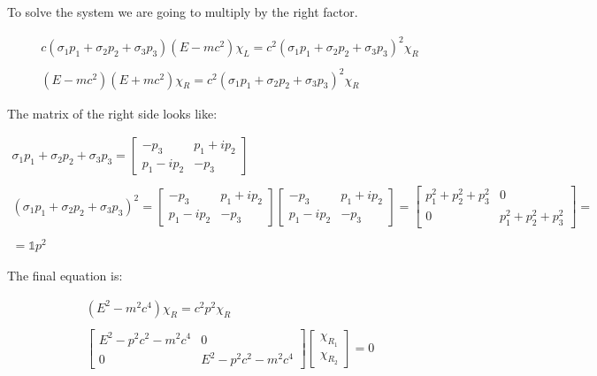 To solve the system we are going to multiply by the right factor.

\begin{equation}
  \begin{array}{c}
    c(\sigma_1 p_1 + \sigma_2 p_2 + \sigma_3 p_3)(E-mc^2) \chi_L = c^2 (\sigma_1 p_1 + \sigma_2 p_2 + \sigma_3 p_3)^2\chi_R
    \\

    \\
    (E-mc^2)(E+mc^2) \chi_R = c^2 (\sigma_1 p_1 + \sigma_2 p_2 + \sigma_3 p_3)^2\chi_R
  \end{array}
\end{equation}

The matrix of the right side looks like:

\begin{equation}
  \begin{array}{c}
    \sigma_1 p_1 + \sigma_2 p_2 + \sigma_3 p_3 = \begin{bmatrix}
      -p_3 & p_1 + ip_2\\
      p_1 - ip_2 & -p_3
      \end{bmatrix}
    \\

    \\
    (\sigma_1 p_1 + \sigma_2 p_2 + \sigma_3 p_3)^2 = \begin{bmatrix}
    -p_3 & p_1 + ip_2\\
    p_1 - ip_2 & -p_3
    \end{bmatrix}\begin{bmatrix}
    -p_3 & p_1 + ip_2\\
    p_1 - ip_2 & -p_3
    \end{bmatrix} = \begin{bmatrix}
    p_1^2 + p_2^2 + p_3^2 & 0\\
    0 & p_1^2 + p_2^2 + p_3^2
    \end{bmatrix} =
    \\

    \\
    = \mathbb{1} p^2
  \end{array}
\end{equation}

The final equation is:

\begin{equation}
  \begin{array}{c}
    (E^2-m^2c^4)\chi_R = c^2 p^2\chi_R
    \\

    \\
    \begin{bmatrix}
      E^2-p^2c^2-m^2c^4 & 0\\
      0 & E^2-p^2c^2-m^2c^4
    \end{bmatrix}
    \begin{bmatrix}
      \chi_R_1\\
      \chi_R_2
    \end{bmatrix} = 0
  \end{array}
\end{equation}

